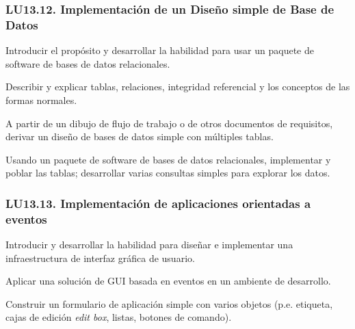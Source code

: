 \subsubsection{LU13.12. Implementación de un Diseño simple de Base de Datos}\label{sec:BOK-LU13.12}\label{sec:LU13.12}
\begin{LearningUnit}
\begin{LUGoal}
\item Introducir el propósito y desarrollar la habilidad para usar un paquete de software de bases de datos relacionales.
\end{LUGoal}

\begin{LUObjective}
\item Describir y explicar tablas, relaciones, integridad referencial y los conceptos de las formas normales.
\item A partir de un dibujo de flujo de trabajo o de otros documentos de requisitos, derivar un diseño de bases de datos simple con múltiples tablas.
\item Usando un paquete de software de bases de datos relacionales, implementar y poblar las tablas; desarrollar varias consultas simples para explorar los datos.
\end{LUObjective}
\end{LearningUnit}

\subsubsection{LU13.13. Implementación de aplicaciones orientadas a eventos}\label{sec:BOK-LU13.13}\label{sec:LU13.13}
\begin{LearningUnit}
\begin{LUGoal}
\item Introducir y desarrollar la habilidad para diseñar e implementar una infraestructura de interfaz gráfica de usuario.
\end{LUGoal}

\begin{LUObjective}
\item Aplicar una solución de GUI basada en eventos en un ambiente de desarrollo.
\item Construir un formulario de aplicación simple con varios objetos (p.e. etiqueta, cajas de edición \textit{edit box}, listas, botones de comando).
\end{LUObjective}
\end{LearningUnit}

